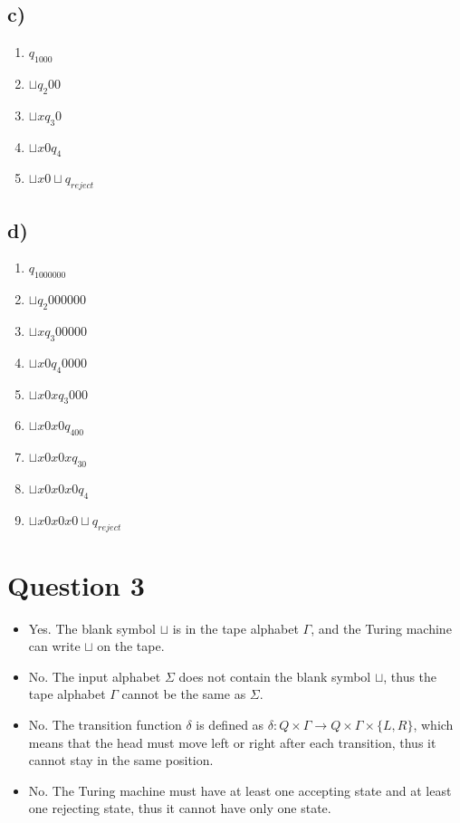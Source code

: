 \documentclass[a4paper, UTF-8]{article}
\theoremstyle{plain}
\begin{document}
\subsection{c)} 

\begin{enumerate}
    \item $q_1000$ 
    \item $\sqcup q_2 00$ 
    \item $\sqcup x q_3 0$ 
    \item $\sqcup x 0 q_4$ 
    \item $\sqcup x 0 \sqcup q_{reject}$
\end{enumerate}

\subsection{d)} 

\begin{enumerate}
    \item $q_1000000$ 
    \item $\sqcup q_2 000000$ 
    \item $\sqcup x q_3 00000$
    \item $\sqcup x 0 q_4 0000$
    \item $\sqcup x 0 x q_3 000$
    \item $\sqcup x 0 x 0 q_400$
    \item $\sqcup x 0 x 0 x q_30$
    \item $\sqcup x 0 x 0 x 0 q_4 $
    \item $\sqcup x 0 x 0 x 0 \sqcup q_{reject}$
\end{enumerate}

\section{Question 3} 

\begin{itemize}
    \item [a.] Yes. The blank symbol $\sqcup$ is in the tape alphabet $\Gamma$, and the Turing machine can write $\sqcup$ on the tape. 
    \item [b.] No. The input alphabet $\Sigma$ does not contain the blank symbol $\sqcup$, thus the tape alphabet $\Gamma$ cannot be the same as $\Sigma$.
    \item [c.] No. The transition function $\delta$ is defined as $\delta: Q \times \Gamma \rightarrow Q \times \Gamma \times \{L, R\}$, which means that the head must move left or right after each transition, thus it cannot stay in the same position.
    \item [d.] No. The Turing machine must have at least one accepting state and at least one rejecting state, thus it cannot have only one state.
\end{itemize}
\end{document}
